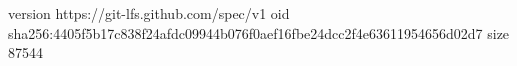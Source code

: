 version https://git-lfs.github.com/spec/v1
oid sha256:4405f5b17c838f24afdc09944b076f0aef16fbe24dcc2f4e63611954656d02d7
size 87544
